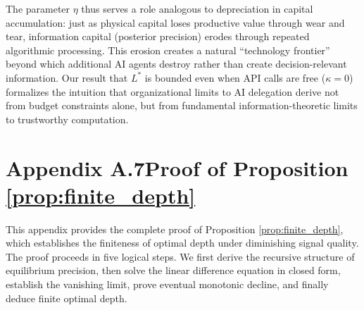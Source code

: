 The parameter $\eta$ thus serves a role analogous to depreciation in capital accumulation: just as physical capital loses productive value through wear and tear, information capital (posterior precision) erodes through repeated algorithmic processing. This erosion creates a natural ``technology frontier'' beyond which additional AI agents destroy rather than create decision-relevant information. Our result that $L^{*}$ is bounded even when API calls are free ($\kappa=0$) formalizes the intuition that organizational limits to AI delegation derive not from budget constraints alone, but from fundamental information-theoretic limits to trustworthy computation.


\newpage
\section*{Appendix A.7\quad Proof of Proposition \ref{prop:finite_depth}}
\label{app:proof_finite_depth}

\renewcommand{\theequation}{A.7.\arabic{equation}}
\setcounter{equation}{0}

This appendix provides the complete proof of Proposition \ref{prop:finite_depth}, which establishes the finiteness of optimal depth under diminishing signal quality. The proof proceeds in five logical steps. We first derive the recursive structure of equilibrium precision, then solve the linear difference equation in closed form, establish the vanishing limit, prove eventual monotonic decline, and finally deduce finite optimal depth.

